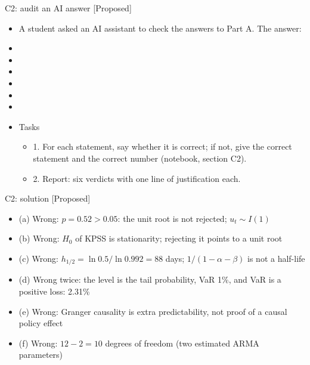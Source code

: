 \begin{frame}{C2: audit an AI answer [Proposed]}
\itemsize{\scriptsize}
\begin{itemize}
    \item A student asked an AI assistant to check the answers to Part A. The answer:
    \item {}
    \item {}
    \item {}
    \item {}
    \item {}
    \item {}
    \item Tasks
    \begin{itemize}
        \item 1. For each statement, say whether it is correct; if not, give the correct statement and the correct number (notebook, section C2).
        \item 2. Report: six verdicts with one line of justification each.
    \end{itemize}
\end{itemize}
\end{frame}

\ifsolutions
\begin{frame}{C2: solution [Proposed]}
\itemsize{\footnotesize}
\begin{itemize}
    \item (a) Wrong: $p = 0.52 > 0.05$: the unit root is not rejected; $u_t \sim I(1)$
    \item (b) Wrong: $H_0$ of KPSS is stationarity; rejecting it points to a unit root
    \item (c) Wrong: $h_{1/2} = \ln 0.5/\ln 0.992 = 88$ days; $1/(1 - \alpha - \beta)$ is not a half-life
    \item (d) Wrong twice: the level is the tail probability, VaR 1\%, and VaR is a positive loss: 2.31\%
    \item (e) Wrong: Granger causality is extra predictability, not proof of a causal policy effect
    \item (f) Wrong: $12 - 2 = 10$ degrees of freedom (two estimated ARMA parameters)
\end{itemize}
\end{frame}
\fi


